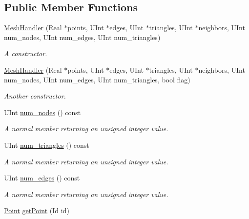 \subsection*{Public Member Functions}
\begin{DoxyCompactItemize}
\item 
\hyperlink{classMeshHandler_a983560a8f515c91a25a13d7d14b751c2}{MeshHandler} (Real $\ast$points, UInt $\ast$edges, UInt $\ast$triangles, UInt $\ast$neighbors, UInt num\_\-nodes, UInt num\_\-edges, UInt num\_\-triangles)
\begin{DoxyCompactList}\small\item\em A constructor. \item\end{DoxyCompactList}\item 
\hyperlink{classMeshHandler_a07339e31fd7550c9a9f8a99deba34074}{MeshHandler} (Real $\ast$points, UInt $\ast$edges, UInt $\ast$triangles, UInt $\ast$neighbors, UInt num\_\-nodes, UInt num\_\-edges, UInt num\_\-triangles, bool flag)
\begin{DoxyCompactList}\small\item\em Another constructor. \item\end{DoxyCompactList}\item 
UInt \hyperlink{classMeshHandler_aad0e450b97d6cf690d31b850524e7cda}{num\_\-nodes} () const 
\begin{DoxyCompactList}\small\item\em A normal member returning an unsigned integer value. \item\end{DoxyCompactList}\item 
UInt \hyperlink{classMeshHandler_a8c6a559cb5b5024d591c1edaa560a111}{num\_\-triangles} () const 
\begin{DoxyCompactList}\small\item\em A normal member returning an unsigned integer value. \item\end{DoxyCompactList}\item 
UInt \hyperlink{classMeshHandler_a545391eb9397b594ecbe0adae69a6887}{num\_\-edges} () const 
\begin{DoxyCompactList}\small\item\em A normal member returning an unsigned integer value. \item\end{DoxyCompactList}\item 
\hyperlink{classPoint}{Point} \hyperlink{classMeshHandler_a5657ecd9b4774575759ba816156e1586}{getPoint} (Id id)

\end{DoxyCompactItemize}
